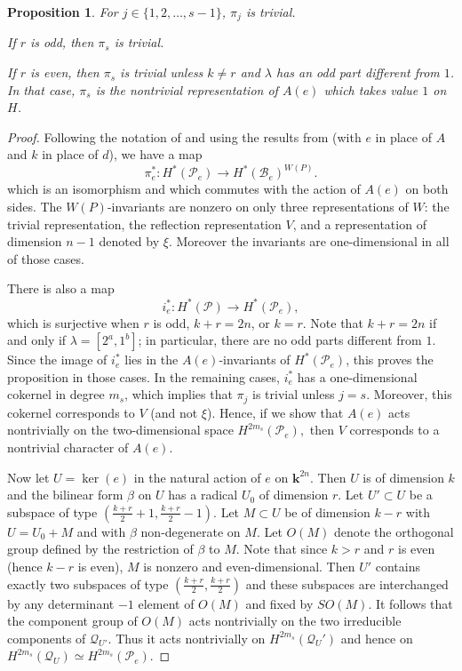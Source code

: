 \documentclass[10pt]{amsart}
\newcommand{\flag}{{\mathcal B}}
\theoremstyle{plain}
\newtheorem{proposition}[theorem]{Proposition}
\theoremstyle{definition}
\theoremstyle{remark}
\begin{document}
\begin{proposition}   \label{me:pij}
For $j \in \{ 1, 2, \dots, s-1 \}$, $\pi_j$ is trivial.

If $r$ is odd, then $\pi_s$ is trivial.

If $r$ is even, then $\pi_s$ is trivial unless $k \neq r$ and $\lambda$ has an odd part different from $1$.
In that case, $\pi_s$ is the 
nontrivial representation of $A(e)$ which takes value $1$ on $H$.
\end{proposition}

\begin{proof}
Following the notation of and using the results from \cite{spaltenstein:reflection} (with $e$ in place of $A$ and $k$ in place
of $d$), we have a map
$$\pi^*_e:  H^*({\mathcal P}_e) \to H^*(\flag_e)^{W(P)}.$$
which is an isomorphism and which commutes with the action of $A(e)$ on both sides.
The $W(P)$-invariants are nonzero on only three representations of $W$:  the trivial representation, 
the reflection representation $V$, and a representation of dimension $n-1$ denoted by $\xi$.  Moreover the invariants
are one-dimensional in all of those cases.

There is also a map $$i^*_e: H^*({\mathcal P}) \to H^*({\mathcal P}_e),$$
which is surjective when $r$ is odd, $k+r=2n$, or $k=r$.  Note
that $k+r=2n$ if and only if $\lambda = [2^a, 1^b]$;  in particular, there are no odd parts different from $1$.
Since the image of $i^*_e$ lies in the $A(e)$-invariants of $H^*({\mathcal P}_e)$,  this proves the proposition in those cases.
In the remaining cases, $i^*_e$ has a one-dimensional cokernel in degree $m_s$, which implies that $\pi_j$ is trivial unless $j=s$.
Moreover, this cokernel corresponds to $V$ (and not $\xi$).
Hence, if we show that $A(e)$ acts nontrivially on the two-dimensional space $H^{2m_s}({\mathcal P}_e),$ then $V$ corresponds to a nontrivial character of $A(e)$.

Now let $U = \ker(e)$ in the natural action of $e$ on $\mathbf{k}^{2n}$.   Then $U$ is of dimension $k$ and the bilinear form $\beta$ on $U$ has a radical $U_0$ of dimension $r$.  Let $U' \subset U$ be a subspace of type $(\frac{k+r}{2}+1, \frac{k+r}{2}-1)$.  Let $M \subset U$ be of dimension $k-r$ with $U = U_0 + M$ and with $\beta$ non-degenerate on $M$.  Let $O(M)$ denote the orthogonal group defined by the restriction of $\beta$ to $M$.  Note that since $k>r$ and $r$ is even (hence $k-r$ is even), $M$ is nonzero and even-dimensional. Then $U'$ contains exactly two subspaces of type $(\frac{k+r}{2}, \frac{k+r}{2})$ and these subspaces are interchanged by any determinant $-1$ element of $O(M)$  
and fixed by $SO(M)$.  It follows that the component group of $O(M)$ acts nontrivially on the two irreducible components of ${\mathcal Q}_{U'}$.
Thus it acts nontrivially on $H^{2m_s}({\mathcal Q}_U')$ and hence on $H^{2m_s}({\mathcal Q}_U) \simeq H^{2m_s}({\mathcal P}_e)$.


\end{proof}
\end{document}
